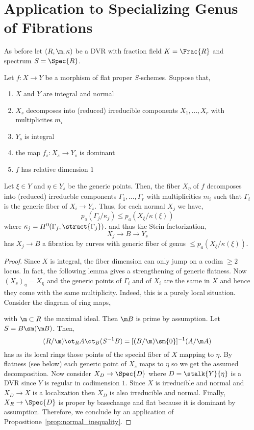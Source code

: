 \documentclass[12pt]{article}
\begin{document}
\section{Application to Specializing Genus of Fibrations}

As before let $(R, \m, \kappa)$ be a DVR with fraction field $K = \Frac{R}$ and spectrum $S = \Spec{R}$.

\begin{prop}
Let $f : X \to Y$ be a morphism of flat proper $S$-schemes. Suppose that,
\begin{enumerate}
\item $X$ and $Y$ are integral and normal
\item $X_s$ decomposes into (reduced) irreducible components $X_1, \dots, X_r$ with multiplicites $m_i$
\item $Y_s$ is integral 
\item the map $f_s : X_s \to Y_s$ is dominant
\item $f$ has relative dimension $1$ 
\end{enumerate}
Let $\xi \in Y$ and $\eta \in Y_s$ be the generic points. Then, the fiber $X_\eta$ of $f$ decomposes into (reduced) irreducble components $\Gamma_1, \dots, \Gamma_r$ with multiplicities $m_i$ such that $\Gamma_i$ is the generic fiber of $X_i \to Y_s$. Thus, for each normal $X_j$ we have,
\[ p_a(\Gamma_j / \kappa_j) \le p_a(X_\xi / \kappa(\xi)) \]
where $\kappa_j = H^0(\Gamma_j, \struct{\Gamma_j})$. and thus the Stein factorization,
\[ X_j \to B \to Y_s \]
has $X_j \to B$ a fibration by curves with generic fiber of genus $\le p_a(X_\xi/\kappa(\xi))$.
\end{prop}

\begin{proof}
Since $X$ is integral, the fiber dimension can only jump on a codim $\ge 2$ locus. In fact, the following lemma gives a strengthening of generic flatness. Now $(X_s)_{\eta} = X_{\eta}$ and the generic points of $\Gamma_i$ and of $X_i$ are the same in $X$ and hence they come with the same multiplicity. Indeed, this is a purely local situation. Consider the diagram of ring maps,
\begin{center}
\end{center}
with $\m \subset R$ the maximal ideal. Then $\m B$ is prime by assumption. Let $S = B \sm (\m B)$. Then,
\[ (R / \m) \ot_R A \ot_B (S^{-1} B) = [(B/\m) \sm \{ 0 \}]^{-1} (A / \m A) \]
has as its local rings those points of the special fiber of $X$ mapping to $\eta$. By flatness (see below) each generic point of $X_s$ maps to $\eta$ so we get the assumed decomposition. Now consider $X_D \to \Spec{D}$ where $D = \stalk{Y}{\eta}$ is a DVR since $Y$ is regular in codimension $1$. Since $X$ is irreducible and normal and $X_D \to X$ is a localization then $X_D$ is also irreducible and normal. Finally, $X_R \to \Spec{D}$ is proper by basechange and flat because it is dominant by assumption. Therefore, we conclude by an application of Propositione~\ref{prop:normal_inequality}.
\end{proof}
\end{document}
